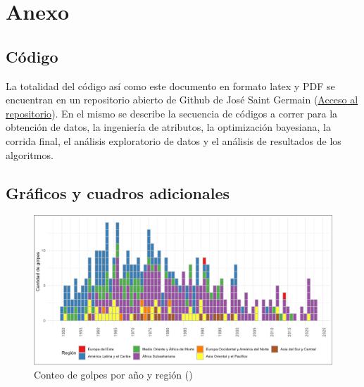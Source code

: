 \documentclass{article}
\begin{document}
\section{Anexo}
\subsection{Código}
La totalidad del código así como este documento en formato latex y PDF se encuentran en un repositorio abierto 
de Github de José Saint Germain (\href{https://github.com/josesg998/esp_data_mining}{Acceso al 
repositorio}). En el mismo se describe la secuencia de códigos a correr para la obtención de 
datos, la ingeniería de atributos, la optimización bayesiana, la corrida final, el análisis 
exploratorio de datos y el análisis de resultados de los algoritmos.

\subsection{Gráficos y cuadros adicionales}
\begin{figure}[H]
 \centering 
 \includegraphics[width=1\textwidth]{4_golpes_anios.png}
 \caption{Conteo de golpes por año y región (\cite{Pow11})\label{fig:golpes_anios}}
\end{figure}
\end{document}
